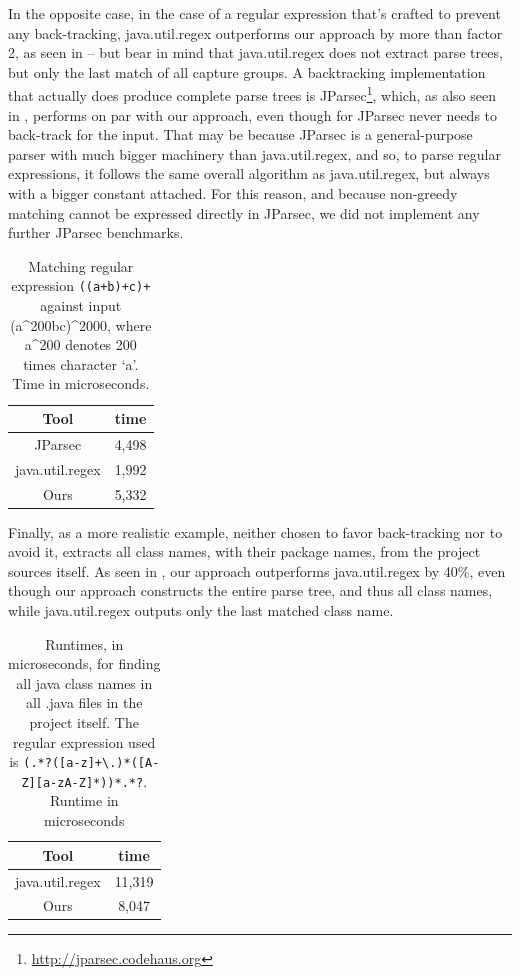 \documentclass[english]{sigplanconf}
\theoremstyle{definition}
\begin{document}
In the opposite case, in the case of a regular expression that's
crafted to prevent any back-tracking, java.util.regex outperforms
our approach by more than factor 2, as seen in  -- but
bear in mind that java.util.regex does not extract parse trees, but
only the last match of all capture groups.  A backtracking
implementation that actually does produce complete parse trees is
JParsec\footnote{\url{http://jparsec.codehaus.org}}, which, as also
seen in , performs on par with our approach, even though
for JParsec never needs to back-track for the input. That may be
because JParsec is a general-purpose parser with much bigger machinery
than java.util.regex, and so, to parse regular expressions, it
follows the same overall algorithm as java.util.regex, but always
with a bigger constant attached.  For this reason, and because
non-greedy matching cannot be expressed directly in JParsec, we did
not implement any further JParsec benchmarks.

\begin{table}
\begin{tabular}{cc}
\hline 
Tool & time\tabularnewline
\hline 
\hline 
JParsec & 4,498\tabularnewline
\hline 
java.util.regex & 1,992\tabularnewline
\hline 
Ours & 5,332\tabularnewline
\hline 
\end{tabular}
\caption{Matching regular expression \texttt{((a+b)+c)+} against input (a\^{}200bc)\^{}2000, where a\^{}200 denotes 200 times character `a'. Time in microseconds.}
\end{table}

Finally, as a more realistic example, neither chosen to favor
back-tracking nor to avoid it,  extracts all class names, with their
package names, from the project sources itself.  As seen in
, our approach outperforms java.util.regex by 40\%,
even though our approach constructs the entire parse tree, and thus
all class names, while java.util.regex outputs only the last matched
class name.

\begin{table}
\begin{tabular}{cc}
\hline 
Tool & time\tabularnewline
\hline 
\hline 
java.util.regex & 11,319\tabularnewline
\hline 
Ours & 8,047\tabularnewline
\hline 
\end{tabular}
\caption{Runtimes, in microseconds, for finding all java class names in all .java files in the project itself. The regular expression used is 
\texttt{(.*?([a-z]+\textbackslash.)*([A-Z][a-zA-Z]*))*.*?}.
Runtime in microseconds}
\end{table}
\end{document}

